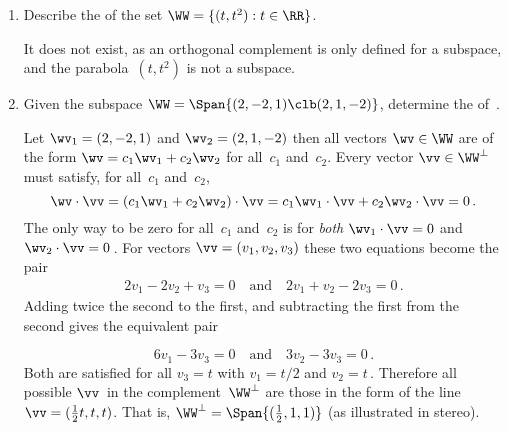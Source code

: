 \begin{example}
\begin{enumerate}[ref=\ref{eg:orthsubsp}(\alph*)]
\item Describe the  of the set \(\WW=\{(t,t^2): t\in\RR\}\).
\begin{solution} 
It does not exist, as an orthogonal complement is only defined for a subspace, and the parabola~\((t,t^2)\) is not a subspace.
\end{solution}



\item Given the subspace \(\WW=\Span\{(2,-2,1)\clb (2,1,-2)\}\), determine the  of~\WW.
\begin{solution} 
Let \(\wv_1=(2,-2,1)\) and \(\wv_2=(2,1,-2)\) then all vectors \(\wv\in\WW\) are of the form \(\wv=c_1\wv_1+c_2\wv_2\) for all~\(c_1\) and~\(c_2\).
Every vector \(\vv\in\WW^\perp\) must satisfy, for all~\(c_1\) and~\(c_2\),
\begin{equation*}
\wv\cdot\vv=(c_1\wv_1+c_2\wv_2)\cdot\vv
=c_1\wv_1\cdot\vv+c_2\wv_2\cdot\vv
=0\,.
\end{equation*}
The only way to be zero for all~\(c_1\) and~\(c_2\) is for \emph{both} \(\wv_1\cdot\vv=0\) and \(\wv_2\cdot\vv=0\)\,.
For vectors \(\vv=(v_1,v_2,v_3)\) these two equations become the pair
\begin{eqnarray*}
2v_1-2v_2+v_3=0 \quad\text{and}\quad 2v_1+v_2-2v_3=0\,.
\end{eqnarray*}
Adding twice the second to the first, and subtracting the first from the second gives the equivalent pair
\par\begin{figbox}{}%
\begin{equation*}
6v_1-3v_3=0\quad\text{and}\quad 3v_2-3v_3=0\,.
\end{equation*}
Both are satisfied for all \(v_3=t\) with \(v_1=t/2\) and \(v_2=t\)\,.
Therefore all possible \(\vv\)~in the complement~\(\WW^\perp\) are those in the form of the line \(\vv=(\tfrac12t,t,t)\).
That is, \(\WW^\perp=\Span\{(\tfrac12,1,1)\}\) (as illustrated in stereo).
\aqed
\end{figbox}
\end{solution}

\end{enumerate}
\end{example}



